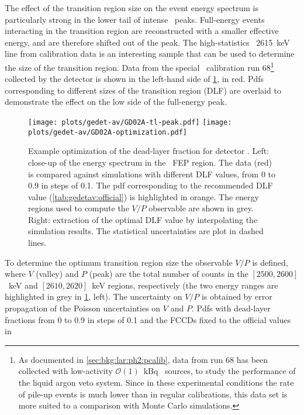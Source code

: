 The effect of the transition region size on the event energy spectrum is particularly
strong in the lower tail of intense \g\ peaks. Full-energy events interacting in the
transition region are reconstructed with a smaller effective energy, and are therefore
shifted out of the peak. The high-statistics \Tl\ 2615~keV line from calibration data is
an interesting sample that can be used to determine the size of the transition region.
Data from the special \Th\ calibration run 68\footnote{%
  As documented in \cref{sec:bkg:lar:ph2:pcalib}, data from run 68 has been collected with
  low-activity $\mathcal{O}(1)$~kBq \Th\ sources, to study the performance of the liquid
  argon veto system. Since in these experimental conditions the rate of pile-up events is
  much lower than in regular calibrations, this data set is more suited to a comparison
  with Monte Carlo simulations.
} collected by the  detector is shown in the left-hand side of
\cref{fig:gedetav:calib-optim-example}, in red. Pdfs corresponding to different sizes of
the transition region (DLF) are overlaid to demonstrate the effect on the low side of the
full-energy peak.
\begin{figure}
  \centering
  \texttt{[image: plots/gedet-av/GD02A-tl-peak.pdf]}%
  \hspace{0.07\textwidth}%
  \texttt{[image: plots/gedet-av/GD02A-optimization.pdf]}
  \caption{%
    Example optimization of the dead-layer fraction for detector . Left: close-up
    of the energy spectrum in the \Tl\ FEP region. The data (red) is compared against
    simulations with different DLF values, from 0 to 0.9 in steps of 0.1. The pdf
    corresponding to the recommended DLF value (\cref{tab:gedetav:official}) is
    highlighted in orange. The energy regions used to compute the $V/P$ observable are
    shown in grey. Right: extraction of the optimal DLF value by interpolating the
    simulation results. The statistical uncertainties are plot in dashed lines.
  }\label{fig:gedetav:calib-optim-example}
\end{figure}
\newpar
To determine the optimum transition region size the observable $V/P$ is defined, where $V$
(valley) and $P$ (peak) are the total number of counts in the $[2500, 2600]$~keV and
$[2610, 2620]$~keV regions, respectively (the two energy ranges are highlighted in grey in
\cref{fig:gedetav:calib-optim-example}, left). The uncertainty on $V/P$ is obtained by
error propagation of the Poisson uncertainties on $V$ and $P$. Pdfs with dead-layer
fractions from 0 to 0.9 in steps of 0.1 and the FCCDs fixed to the official values in
